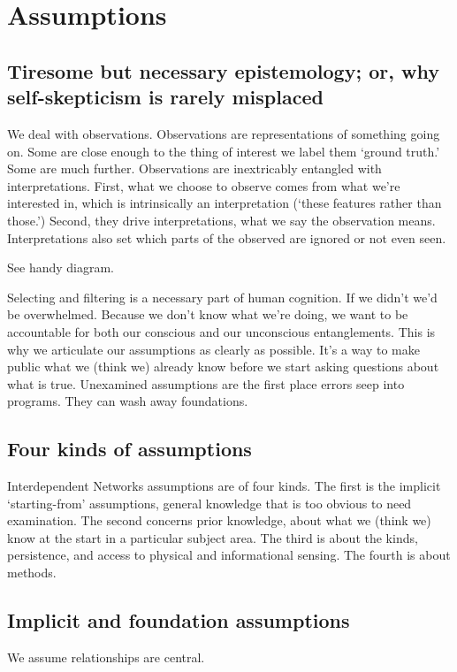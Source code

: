 \documentclass{article} %
\begin{document}
\pagebreak
\section{Assumptions}
\subsection{Tiresome but necessary epistemology; or, why self-skepticism is rarely misplaced}
We deal with observations. Observations are representations of something going on. Some are close enough to the thing of interest we label them `ground truth.' Some are much further. Observations are inextricably entangled with interpretations. First, what we choose to observe comes from what  we're interested in, which is intrinsically an interpretation (`these features rather than those.') Second, they drive interpretations, what we say the observation means. Interpretations also set which parts of the observed are ignored or not even seen. 

See handy diagram.

Selecting and filtering is a necessary part of human cognition. If we didn't we'd be overwhelmed. Because we don't know what we're doing, we want to be accountable for both our conscious and our unconscious entanglements. This is why we articulate our assumptions as clearly as possible. It's a way to make public what we (think we) already know before we start asking questions about what is true. Unexamined assumptions are the first place errors seep into programs. They can wash away foundations.

\subsection{Four kinds of assumptions}
Interdependent Networks assumptions are of four kinds. The first is the implicit `starting-from' assumptions, general knowledge that is too obvious to need examination. The second concerns prior knowledge, about what we (think we) know at the start in a particular subject area. The third is about the kinds, persistence, and access to physical and informational sensing. The fourth is about methods.

\subsection{Implicit and foundation assumptions}
We assume relationships are central. 
\end{document}
